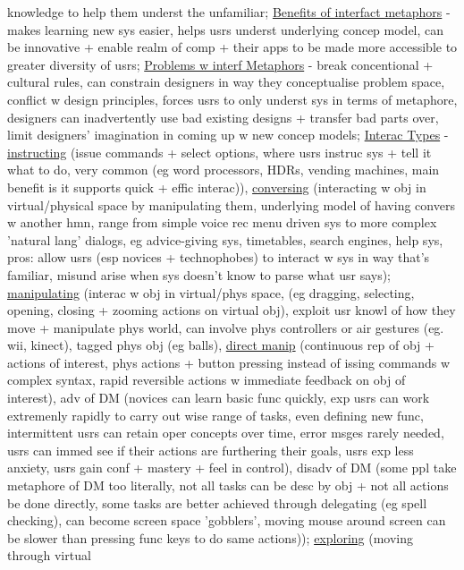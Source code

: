 \documentclass[a4paper]{article}
\begin{document}
\begin{multicols}{3}
        knowledge to help them underst the unfamiliar; \underline{Benefits of interfact metaphors} - makes learning new
        sys easier, helps usrs underst underlying concep model, can be innovative + enable realm of comp + their apps to be made more accessible to greater diversity of usrs; \underline{Problems w interf Metaphors} -
        break concentional + cultural rules, can constrain designers in way they conceptualise problem space, conflict w design principles, forces usrs to only underst sys in terms of metaphore, designers can
        inadvertently use bad existing designs + transfer bad parts over, limit designers' imagination in coming up w new concep models; \underline{Interac Types} - \underline{instructing} (issue commands + select options, where usrs instruc sys
        + tell it what to do, very common (eg word processors, HDRs, vending machines, main benefit is it supports quick + effic interac)), \underline{conversing}
        (interacting w obj in virtual/physical space by manipulating them, underlying model of having convers w another hmn, range from simple voice rec menu driven sys to more complex 'natural lang' dialogs,
        eg advice-giving sys, timetables, search engines, help sys, pros: allow usrs (esp novices + technophobes) to interact w sys in way that's familiar, misund arise when sys doesn't know to parse what usr says);
        \underline{manipulating} (interac w obj in virtual/phys space, (eg dragging, selecting, opening, closing + zooming actions on virtual obj), exploit usr knowl of how they move + manipulate phys world, can involve phys controllers or
        air gestures (eg. wii, kinect), tagged phys obj (eg balls), \underline{direct manip} (continuous rep of obj + actions of interest, phys actions + button pressing instead of issing commands w complex syntax,
        rapid reversible actions w immediate feedback on obj of interest), adv of DM (novices can learn basic func quickly, exp usrs can work extremenly rapidly to carry out wise range of
        tasks, even defining new func, intermittent usrs can retain oper concepts over time, error msges rarely needed, usrs can immed see if their actions are furthering their goals, usrs exp less anxiety, usrs gain conf
        + mastery + feel in control), disadv of DM (some ppl take metaphore of DM too literally, not all tasks can be desc by obj + not all actions be done directly, some tasks are better achieved through
        delegating (eg spell checking), can become screen space 'gobblers', moving mouse around screen can be slower than pressing func keys to do same actions)); \underline{exploring} (moving through virtual

\end{multicols}
\end{document}
